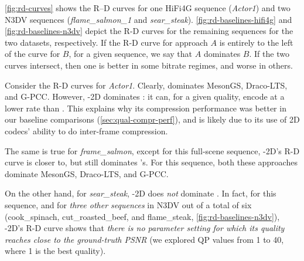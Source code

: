 

%
\cref{fig:rd-curves} shows the R--D curves for one HiFi4G sequence (\textit{Actor1}) and two N3DV sequences (\textit{flame\_salmon\_1} and \textit{sear\_steak}).
%
\cref{fig:rd-baselines-hifi4g} and \cref{fig:rd-baselines-n3dv} depict the R-D curves for the remaining sequences for the two datasets, respectively.
%
If the R-D curve for approach $A$ is entirely to the left of the curve for $B$, for a given sequence, we say that $A$ dominates $B$.
%
If the two curves intersect, then one is better in some bitrate regimes, and worse in others.

Consider the R-D curves for \textit{Actor1}.
%
Clearly, \gsnfs{} dominates MesonGS, Draco-LTS, and G-PCC.
%
However, \vthree{}-2D dominates \gsnfs{}: it can, for a given quality, encode at a lower rate than \gsnfs{}.
%
This explains why its compression performance was better in our baseline comparisons (\cref{sec:qual-compr-perf}), and is likely due to its use of 2D codecs' ability to do inter-frame compression.

The same is true for \textit{frame\_salmon}, except for this full-scene sequence, \vthree{}-2D's R-D curve is closer to, but still dominates \gsnfs{}'s.
%
For this sequence, both these approaches dominate MesonGS, Draco-LTS, and G-PCC.

On the other hand, for \textit{sear\_steak}, \vthree{}-2D does \textit{not} dominate \gsnfs{}.
%
In fact, for this sequence, and for \textit{three other sequences} in N3DV out of a total of six (cook\_spinach, cut\_roasted\_beef, and flame\_steak, \cref{fig:rd-baselines-n3dv}), \vthree{}-2D's R-D curve shows that \textit{there is no parameter setting for which its quality reaches close to the ground-truth PSNR} (we explored QP values from 1 to 40, where 1 is the best quality).

